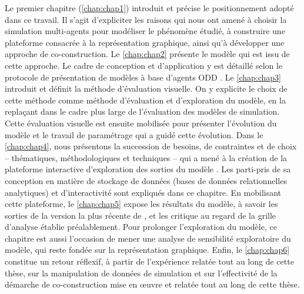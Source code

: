 Le premier chapitre (\cref{chap:chap1}) introduit et précise le positionnement adopté dans ce travail.
Il s'agit d'expliciter les raisons qui nous ont amené à choisir la simulation multi-agents pour modéliser le phénomène étudié, à construire une plateforme consacrée à la représentation graphique, ainsi qu'à développer une approche de co-construction.
Le \cref{chap:chap2} présente le modèle \og \simfeodal{}\fg{} qui est issu de cette approche. Le cadre de conception et d'application y est détaillé selon le protocole de présentation de modèles à base d'agents \og ODD\fg{} \autocite{grimm_odd_2010}.
Le \cref{chap:chap3} introduit et définit la méthode d'\og{}évaluation visuelle\fg{}.
On y explicite le choix de cette méthode comme méthode d'évaluation et d'exploration du modèle, en la replaçant dans le cadre plus large de l'évaluation des modèles de simulation.
Cette évaluation visuelle est ensuite mobilisée pour présenter l'évolution du modèle et le travail de \og paramétrage\fg{} qui a guidé cette évolution.
Dans le \cref{chap:chap4}, nous présentons la succession de besoins, de contraintes et de choix -- thématiques, méthodologiques et techniques -- qui a mené à la création de la plateforme interactive d'exploration des sorties du modèle \simedb{}.
Les parti-pris de sa conception en matière de stockage de données (bases de données relationnelles analytiques) et d'interactivité sont expliqués dans ce chapitre.
En mobilisant cette plateforme, le \cref{chap:chap5} expose les résultats du modèle, à savoir les sorties de la version la plus récente de \simfeodal{}, et les critique au regard de la grille d'analyse établie préalablement.
Pour prolonger l'exploration du modèle, ce chapitre est aussi l'occasion de mener une analyse de sensibilité exploratoire du modèle, qui reste fondée sur la représentation graphique.
Enfin, le \cref{chap:chap6} constitue un retour réflexif, à partir de l'expérience relatée tout au long de cette thèse, sur la manipulation de données de simulation et sur l'effectivité de la démarche de co-construction mise en œuvre et relatée tout au long de cette thèse.


\clearpage
\FancyChapter